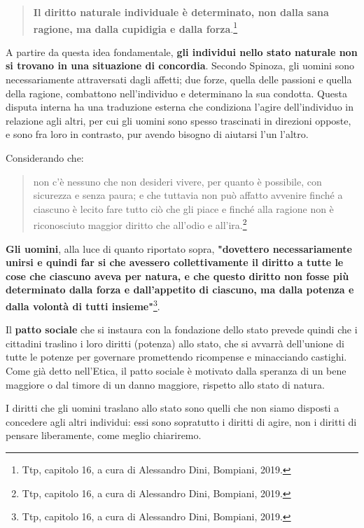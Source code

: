 \begin{quotation}
	\small 	\textbf{Il diritto naturale individuale è determinato, non dalla
	sana ragione, ma dalla cupidigia e dalla forza}.\footnote{Ttp, capitolo 16, a cura di Alessandro Dini, Bompiani, 2019.}
	
\end{quotation}

A partire da questa idea fondamentale, \textbf{gli individui nello stato naturale non
si trovano in una situazione di concordia}. Secondo Spinoza, gli uomini sono necessariamente attraversati dagli affetti; due forze, quella delle passioni e quella della ragione, combattono nell’individuo e determinano la sua condotta. Questa disputa
interna ha una traduzione esterna che condiziona l’agire dell’individuo in relazione agli altri, per cui gli uomini sono spesso trascinati in direzioni opposte, e sono fra loro
in contrasto, pur avendo bisogno di aiutarsi l’un l’altro.

Considerando che:
\begin{quotation}
	\small non c'è nessuno che non desideri vivere, per quanto è possibile, con sicurezza e senza paura; e che tuttavia non può affatto avvenire finché a ciascuno è lecito fare tutto ciò che gli piace e finché alla ragione non è riconosciuto maggior diritto che all'odio e all'ira.\footnote{Ttp, capitolo 16, a cura di Alessandro Dini, Bompiani, 2019.}
	
\end{quotation}

\textbf{Gli uomini}, alla luce di quanto riportato sopra, \textbf{"dovettero necessariamente unirsi e quindi far si che avessero collettivamente il diritto a tutte le cose che ciascuno aveva per natura, e che questo diritto non fosse più determinato dalla forza e dall'appetito di ciascuno, ma dalla potenza e dalla volontà di tutti insieme"}\footnote{Ttp, capitolo 16, a cura di Alessandro Dini, Bompiani, 2019.}.

Il \textbf{patto sociale} che si instaura con la fondazione dello stato prevede quindi che i cittadini traslino i loro diritti (potenza) allo stato, che si avvarrà dell'unione di tutte le potenze per governare promettendo ricompense e minacciando castighi.
Come già detto nell'Etica, il patto sociale è motivato dalla speranza di un bene maggiore  o dal timore di un danno maggiore, rispetto allo stato di natura. 

I diritti che gli uomini traslano allo stato sono quelli che non siamo disposti a concedere agli altri individui: essi sono sopratutto i diritti di agire, non i diritti di pensare liberamente, come meglio chiariremo.

